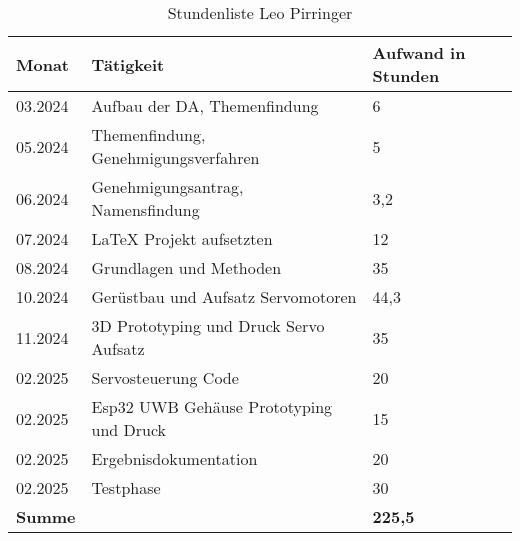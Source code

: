 \begin{table}[h]
	\begin{tabular}{p{2.5cm} p{10.5cm} p{3cm}}
		\hline
		\textbf{Monat} & \textbf{Tätigkeit} & \textbf{Aufwand in Stunden} \\
		\hline
		03.2024 & Aufbau der DA, Themenfindung & 6 \\
		05.2024 & Themenfindung, Genehmigungsverfahren & 5 \\
		06.2024 & Genehmigungsantrag, Namensfindung & 3,2 \\
		07.2024 & LaTeX Projekt aufsetzten& 12 \\
		08.2024 & Grundlagen und Methoden & 35 \\
		10.2024 & Gerüstbau und Aufsatz Servomotoren & 44,3 \\
		11.2024 & 3D Prototyping und Druck Servo Aufsatz & 35 \\
		02.2025 & Servosteuerung Code & 20 \\
		02.2025 & Esp32 UWB Gehäuse Prototyping und Druck& 15\\
		02.2025 & Ergebnisdokumentation &  20\\
		02.2025 & Testphase & 30 \\
		
		\hline
		\textbf{Summe} & & \textbf{225,5} \\
		\hline
	\end{tabular}
	\caption{Stundenliste Leo Pirringer}
	\label{tab:arbeitsaufwand_Pirringer}
\end{table}